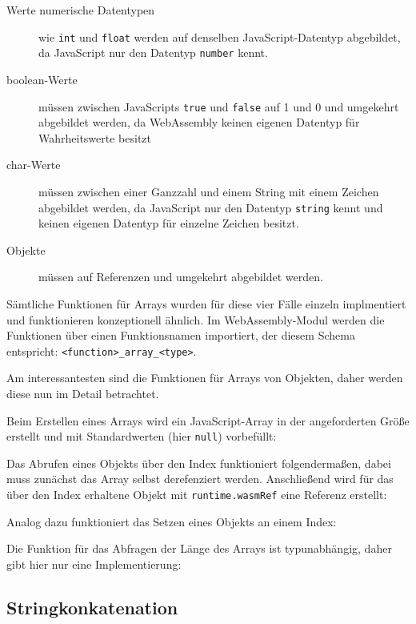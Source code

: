 \begin{description}
    \item[Werte numerische Datentypen] wie \lstinline{int} und \lstinline{float} werden auf denselben JavaScript-Daten\-typ abgebildet, da JavaScript nur den Datentyp \lstinline{number} kennt.
    \item[boolean-Werte] müssen zwischen JavaScripts \lstinline{true} und \lstinline{false} auf 1 und 0 und umgekehrt abgebildet werden, da WebAssembly keinen eigenen Datentyp für Wahrheitswerte besitzt
    \item[char-Werte] müssen zwischen einer Ganzzahl und einem String mit einem Zeichen abgebildet werden, da JavaScript nur den Datentyp \lstinline{string} kennt und keinen eigenen Datentyp für einzelne Zeichen besitzt.
    \item[Objekte] müssen auf Referenzen und umgekehrt abgebildet werden. 
\end{description}

Sämtliche Funktionen für Arrays wurden für diese vier Fälle einzeln implmentiert und funktionieren konzeptionell ähnlich. Im WebAssembly-Modul werden die Funktionen über einen Funktionsnamen importiert, der diesem Schema entspricht: \lstinline{<function>_array_<type>}.

Am interessantesten sind die Funktionen für Arrays von Objekten, daher werden diese nun im Detail betrachtet.

Beim Erstellen eines Arrays wird ein JavaScript-Array in der angeforderten Größe erstellt und mit Standardwerten (hier \lstinline{null}) vorbefüllt:


Das Abrufen eines Objekts über den Index funktioniert folgendermaßen, dabei muss zunächst das Array selbst derefenziert werden. Anschließend wird für das über den Index erhaltene Objekt mit \lstinline{runtime.wasmRef} eine Referenz erstellt:


Analog dazu funktioniert das Setzen eines Objekts an einem Index:


Die Funktion für das Abfragen der Länge des Arrays ist typunabhängig, daher gibt hier nur eine Implementierung:



\subsection{Stringkonkatenation}

